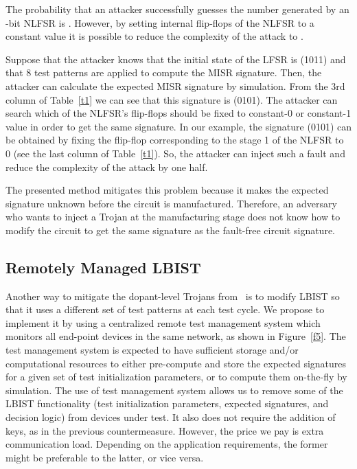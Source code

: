 \documentclass[a4paper]{llncs}
\begin{document}
The probability that an attacker successfully 
guesses the number generated by an -bit NLFSR is .
However, by setting  internal flip-flops of the NLFSR to a constant value
it is possible to reduce the complexity of the attack to . 

Suppose that the attacker knows that the initial state of the LFSR is (1011) and that 8 test patterns are applied to compute the MISR signature. Then, the attacker can calculate the expected MISR signature by simulation. From the 3rd column of Table~\ref{t1} we can see that this signature is (0101). The attacker can search which of the NLFSR's flip-flops should be fixed to constant-0 or constant-1 value in order to get the same signature. In our example, the signature (0101) can be obtained by fixing the flip-flop corresponding to the stage 1 of the NLFSR to 0 (see the last column of Table~\ref{t1}). So, the attacker can inject such a fault and reduce the complexity of the attack by one half. 

The presented method mitigates this problem because it makes the expected signature unknown before the circuit is manufactured. Therefore, an adversary who wants to inject a Trojan at the manufacturing stage does not know how to modify the circuit to get the same signature as the fault-free circuit signature.

\subsection{Remotely Managed LBIST} 

Another way to mitigate the dopant-level Trojans from~\cite{BeRPB13} is to modify 
LBIST so that it uses a different set of test patterns at each test cycle. 
We propose to implement it by using a centralized
remote test management system which monitors all end-point devices in the same network, as shown in Figure~\ref{f5}. The test management system is expected to have sufficient storage and/or computational resources to either pre-compute and store the expected signatures for a given set of test initialization parameters, or to compute them on-the-fly by simulation. The use of test management system allows us to remove some of the LBIST functionality (test initialization parameters, expected signatures, and decision logic) from devices under test. It also does not require the addition of keys, as in the previous countermeasure. However, the price we pay is extra communication load. Depending on the application requirements, the former might be preferable to the latter, or vice versa.
\end{document}
